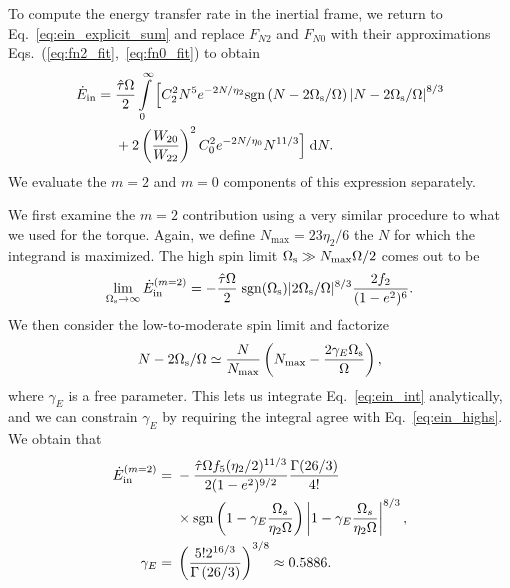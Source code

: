 \documentclass[
        fleqn,
        usenatbib,
    ]{mnras}
\newcommand*{\p}[1]{\left(#1\right)}
\begin{document}
To compute the energy transfer rate in the inertial frame, we return to
Eq.~\eqref{eq:ein_explicit_sum} and replace $F_{N2}$ and $F_{N0}$ with their
approximations Eqs.~(\ref{eq:fn2_fit},~\ref{eq:fn0_fit}) to obtain
\begin{align}
    \dot{E}_{\rm in} ={}&
        \frac{\hat{\tau} \Omega}{2} \int\limits_0^\infty \Big[
            C_2^2 N^5 e^{-2N/\eta_2} \mathrm{sgn}\left(N - 2\Omega_{\rm s} /
                \Omega\right) \left|N - 2 \Omega_{\rm s} /
                \Omega\right|^{8/3}\nonumber\\
            &+ 2 \p{\frac{W_{20}}{W_{22}}}^2 C_0^2 e^{-2N / \eta_0} N^{11/3}
        \Big]\;\mathrm{d}N.\label{eq:ein_int}
\end{align}
We evaluate the $m = 2$ and $m = 0$ components of this expression separately.

We first examine the $m = 2$ contribution using a very similar procedure to what
we used for the torque. Again, we define $N_{\max} = 23\eta_2 / 6$ the $N$ for
which the integrand is maximized. The high spin limit $\Omega_{\rm s} \gg
N_{\max}\Omega / 2$ comes out to be
\begin{equation}
    \lim_{\Omega_{\rm s} \to \infty} \dot{E}_{\rm in}^{(m=2)} =
        -\frac{\hat{\tau}\Omega}{2} \; \mathrm{sgn}(\Omega_{\rm s})|2\Omega_{\rm
        s}/\Omega|^{8/3} \frac{2f_2}{(1 - e^2)^6}.\label{eq:ein_highs}
\end{equation}
We then consider the low-to-moderate spin limit and factorize
\begin{equation}
    N - 2\Omega_{\rm s} / \Omega \simeq \frac{N}{N_{\max}}
        \left(N_{\max} - \frac{2\gamma_E
        \Omega_{\rm s}}{\Omega}\right)\label{eq:nmax_ansatz},
\end{equation}
where $\gamma_E$ is a free parameter. This lets us integrate
Eq.~\eqref{eq:ein_int} analytically, and we can constrain $\gamma_E$ by
requiring the integral agree with Eq.~\eqref{eq:ein_highs}. We obtain that
\begin{align}
    \dot{E}_{\rm in}^{(m=2)}
        ={}& -\frac{\hat{\tau}\Omega f_5 (\eta_2/2)^{11/3}}{2(1-e^2)^{9/2}}
            \frac{\Gamma(26/3)}{4!}\nonumber\\
        &\times \mathrm{sgn}\p{1 - \gamma_E\frac{\Omega_s}{\eta_2 \Omega}}
            \left|1 - \gamma_E\frac{\Omega_s}{\eta_2 \Omega}\right|^{8/3},\\
    \gamma_E ={}& \p{\frac{5! 2^{16/3}}{\Gamma\p{26/3}}}^{3/8}
        \approx 0.5886.
\end{align}
\end{document}
